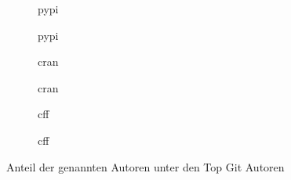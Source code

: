 \begin{figure}[H]
    \begin{subfigure}{.5\textwidth}
        \centering
        
        \caption{\gls{pypi}}
        \label{fig:common_authors_2_pypi}
    \end{subfigure}%
    \begin{subfigure}{.5\textwidth}
        \centering
        
        \caption{\gls{pypi}}
        \label{fig:common_authors_2_by_lines_pypi}
    \end{subfigure}
    \begin{subfigure}{.5\textwidth}
        \centering
        
        \caption{\gls{cran}}
        \label{fig:common_authors_2_cran}
    \end{subfigure}%
    \begin{subfigure}{.5\textwidth}
        \centering
        
        \caption{\gls{cran}}
        \label{fig:common_authors_2_by_lines_cran}
    \end{subfigure}
    \begin{subfigure}{.5\textwidth}
        \centering
        
        \caption{\gls{cff}}
        \label{fig:common_authors_2_cff}
    \end{subfigure}%
    \begin{subfigure}{.5\textwidth}
        \centering
        
        \caption{\gls{cff}}
        \label{fig:common_authors_2_by_lines_cff}
    \end{subfigure}
    \caption{Anteil der genannten Autoren unter den Top Git Autoren}
    \label{fig:common_authors_2_anhang}
\end{figure}

